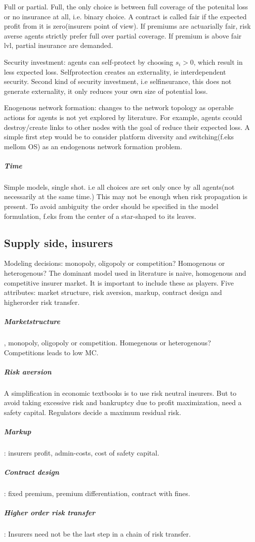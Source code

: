 Full or partial. Full, the only choice is between full coverage of the potenital loss or no insurance at all, i.e. binary choice.
A contract is called fair if the expected profit from it is zero(insurers point of view).
 If premiums are actuarially fair, risk averse agents strictly prefer full over partial coverage. 
If premium is above fair lvl, partial insurance are demanded. 

Security investment: agents can self-protect by choosing $s_{i}>0$, which result in less expected loss. 
Selfprotection creates an externality, ie interdependent security.
Second kind of security investment, i.e selfinsurance, this does not generate externality, 
it only reduces your own size of potential loss. 

Enogenous network formation: changes to the network topology as operable actions for agents is not yet explored by literature.
For example, agents ccould destroy/create links to other nodes with the goal of reduce their expected loss. 
A simple first step would be to consider platform diversity and switching(f.eks mellom OS) as an endogenous network formation problem. 

\subparagraph{Time}
Simple models, single shot. i.e all choices are set only once by all agents(not necessarily at the same time.)
This may not be enough when risk propagation is present. To avoid ambiguity the order should be specified in the model formulation, f.eks from the center of a star-shaped to its leaves.
\subsection{Supply side, insurers}
Modeling decisions: monopoly, oligopoly or competition? Homogenous or heterogenous?
The dominant model used in literature is naive, homogenous and competitive insurer market. 
It is important to include these as players. 
Five attributes: market structure, risk aversion, markup, contract design and higherorder risk transfer.
\subparagraph{ Marketstructure}, monopoly, oligopoly or competition. Homegenous or heterogenous? 
Competitions leads to low MC. 
\subparagraph{ Risk aversion} A simplification in economic textbooks is to use risk neutral insurers.
But to avoid taking excessive risk and bankruptcy due to profit maximization, need a safety capital. Regulators decide a maximum residual risk. 
\subparagraph{Markup}: insurers profit, admin-costs, cost of safety capital. 
\subparagraph{Contract design}: fixed premium, premium differentiation, contract with fines.
\subparagraph{Higher order risk transfer}:
Insurers need not be the last step in a chain of risk transfer. 

